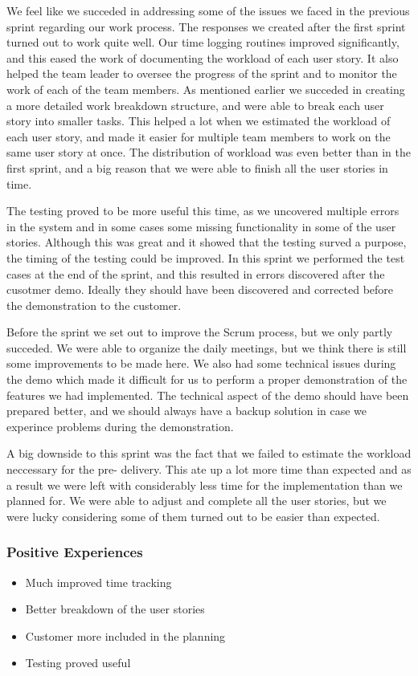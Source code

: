 We feel like we succeded in addressing some of the issues we faced in the previous sprint regarding our work process. The responses we created after the first sprint turned out to work quite well. Our time logging routines improved significantly, and this eased the work of documenting the workload of each user story. It also helped the team leader to oversee the progress of the sprint and to monitor the work of each of the team members. As mentioned earlier we succeded in creating a more detailed work breakdown structure, and were able to break each user story into smaller tasks. This helped a lot when we estimated the workload of each user story, and made it easier for multiple team members to work on the same user story at once. The distribution of workload was even better than in the first sprint, and a big reason that we were able to finish all the user stories in time.

The testing proved to be more useful this time, as we uncovered multiple errors in the system and in some cases some missing functionality in some of the user stories. Although this was great and it showed that the testing surved a purpose, the timing of the testing could be improved. In this sprint we performed the test cases at the end of the sprint, and this resulted in errors discovered after the cusotmer demo. Ideally they should have been discovered and corrected before the demonstration to the customer.

Before the sprint we set out to improve the Scrum process, but we only partly succeded. We were able to organize the daily meetings, but we think there is still some improvements to be made here. We also had some technical issues during the demo which made it difficult for us to perform a proper demonstration of the features we had implemented. The technical aspect of the demo should have been prepared better, and we should always have a backup solution in case we experince problems during the demonstration.

A big downside to this sprint was the fact that we failed to estimate the workload neccessary for the pre- delivery. This ate up a lot more time than expected and as a result we were left with considerably less time for the implementation than we planned for. We were able to adjust and complete all the user stories, but we were lucky considering some of them turned out to be easier than expected.


\subsubsection{Positive Experiences}
\begin{itemize}
\item Much improved time tracking
\item Better breakdown of the user stories
\item Customer more included in the planning
\item Testing proved useful
\end{itemize}


